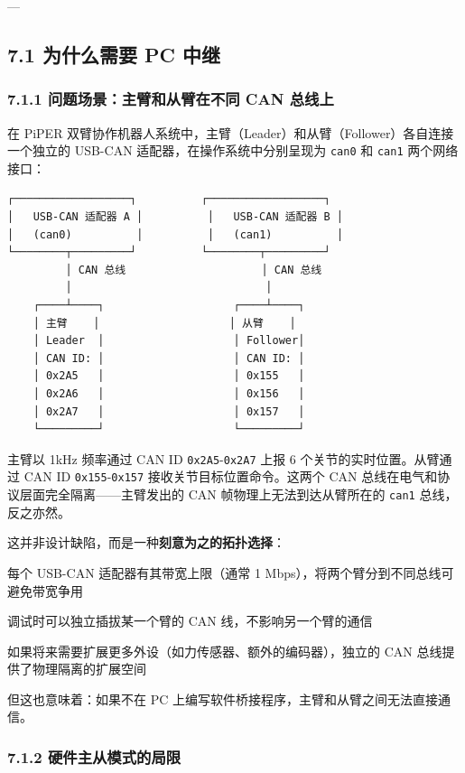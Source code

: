 \documentclass[UTF8,a4paper,11pt]{ctexart}
\begin{document}
{---

\subsection{7.1 为什么需要 PC 中继}

\subsubsection{7.1.1 问题场景：主臂和从臂在不同 CAN 总线上}

在 PiPER 双臂协作机器人系统中，主臂（Leader）和从臂（Follower）各自连接一个独立的 USB-CAN 适配器，在操作系统中分别呈现为 \texttt{can0} 和 \texttt{can1} 两个网络接口：

\begin{lstlisting}[language=text]
┌──────────────────┐          ┌──────────────────┐
│   USB-CAN 适配器 A │          │   USB-CAN 适配器 B │
│   (can0)          │          │   (can1)          │
└────────┬─────────┘          └────────┬─────────┘
         │ CAN 总线                     │ CAN 总线
         │                              │
    ┌────┴────┐                    ┌────┴────┐
    │ 主臂    │                    │ 从臂    │
    │ Leader  │                    │ Follower│
    │ CAN ID: │                    │ CAN ID: │
    │ 0x2A5   │                    │ 0x155   │
    │ 0x2A6   │                    │ 0x156   │
    │ 0x2A7   │                    │ 0x157   │
    └─────────┘                    └─────────┘
\end{lstlisting}

主臂以 1kHz 频率通过 CAN ID \texttt{0x2A5}-\texttt{0x2A7} 上报 6 个关节的实时位置。从臂通过 CAN ID \texttt{0x155}-\texttt{0x157} 接收关节目标位置命令。这两个 CAN 总线在电气和协议层面完全隔离——主臂发出的 CAN 帧物理上无法到达从臂所在的 \texttt{can1} 总线，反之亦然。

这并非设计缺陷，而是一种\textbf{刻意为之的拓扑选择}：
\item 每个 USB-CAN 适配器有其带宽上限（通常 1 Mbps），将两个臂分到不同总线可避免带宽争用
\item 调试时可以独立插拔某一个臂的 CAN 线，不影响另一个臂的通信
\item 如果将来需要扩展更多外设（如力传感器、额外的编码器），独立的 CAN 总线提供了物理隔离的扩展空间

但这也意味着：如果不在 PC 上编写软件桥接程序，主臂和从臂之间无法直接通信。

\subsubsection{7.1.2 硬件主从模式的局限}

}
\end{document}
